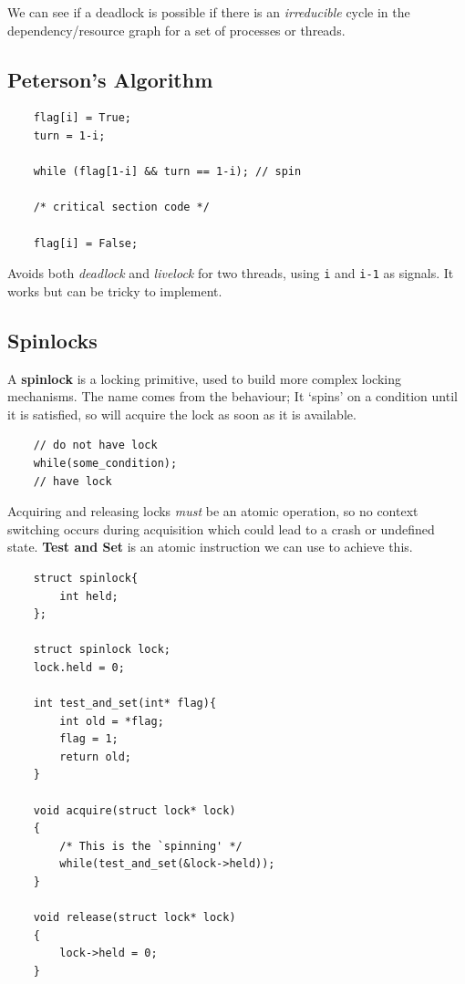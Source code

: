 \documentclass[a4]{article}
\begin{document}
We can see if a deadlock is possible if there is an \emph{irreducible} cycle in the dependency/resource graph for a set of 
processes or threads.

\subsection{Peterson's Algorithm}\label{petersons-algorithm}

\begin{verbatim}
    flag[i] = True;
    turn = 1-i;

    while (flag[1-i] && turn == 1-i); // spin

    /* critical section code */

    flag[i] = False;
\end{verbatim}

Avoids both \emph{deadlock} and \emph{livelock} for two threads, using
\texttt{i} and \texttt{i-1} as signals. It works but can be tricky to
implement.

\subsection{Spinlocks}\label{spinlocks}

A \textbf{spinlock} is a locking primitive, used to build more complex
locking mechanisms. The name comes from the behaviour; It `spins' on a
condition until it is satisfied, so will acquire the lock as soon as it
is available.

\begin{verbatim}
    // do not have lock
    while(some_condition);
    // have lock
\end{verbatim}

Acquiring and releasing locks \emph{must} be an atomic operation, so no
context switching occurs during acquisition which could lead to a crash
or undefined state. \textbf{Test and Set} is an atomic instruction we
can use to achieve this.

\begin{verbatim}
    struct spinlock{
        int held;
    };

    struct spinlock lock;
    lock.held = 0;

    int test_and_set(int* flag){
        int old = *flag;
        flag = 1;
        return old;
    }

    void acquire(struct lock* lock)
    {
        /* This is the `spinning' */
        while(test_and_set(&lock->held));
    }

    void release(struct lock* lock)
    {
        lock->held = 0;
    }
\end{verbatim}
\end{document}
